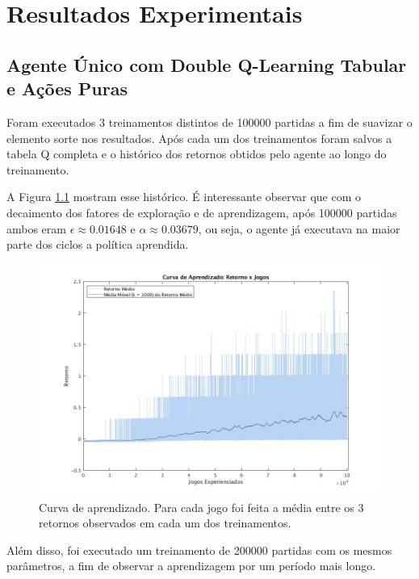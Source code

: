 \chapter{Resultados Experimentais \label{chap:Resultados}}



\section{Agente Único com Double Q-Learning Tabular e Ações Puras}

Foram executados 3 treinamentos distintos de 100000 partidas a fim de suavizar o elemento sorte nos resultados. Após cada um dos treinamentos foram salvos a tabela Q completa e o histórico dos retornos obtidos pelo agente ao longo do treinamento.

A Figura \ref{fig:single-agent-curva} mostram esse histórico. É interessante observar que com o decaimento dos fatores de exploração e de aprendizagem, após 100000 partidas ambos eram $\epsilon \approx 0.01648$ e $\alpha \approx 0.03679$, ou seja, o agente já executava na maior parte dos ciclos a política aprendida.

\begin{figure}[h]
	\includegraphics[width=0.8\linewidth]{figs/curva-qtabular.jpg}
	\centering
	\caption{Curva de aprendizado. Para cada jogo foi feita a média entre os 3 retornos observados em cada um dos treinamentos.}
	\label{fig:single-agent-curva}
\end{figure}

Além disso, foi executado um treinamento de 200000 partidas com os mesmos parâmetros, a fim de observar a aprendizagem por um período mais longo.

